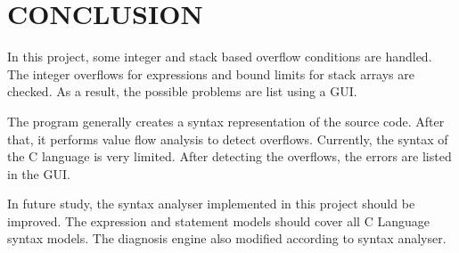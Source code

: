 \chapter{CONCLUSION}
In this project, some integer and stack based overflow conditions are handled. The integer overflows for expressions and bound limits for stack arrays are checked. As a result, the possible problems are list using a GUI. 

The program generally creates a syntax representation of the source code. After that, it performs value flow analysis to detect overflows. Currently, the syntax of the C language is very limited. After detecting the overflows, the errors are listed in the GUI.

In future study, the syntax analyser implemented in this project should be improved. The expression and statement models should cover all C Language syntax models. The diagnosis engine also modified according to syntax analyser. 